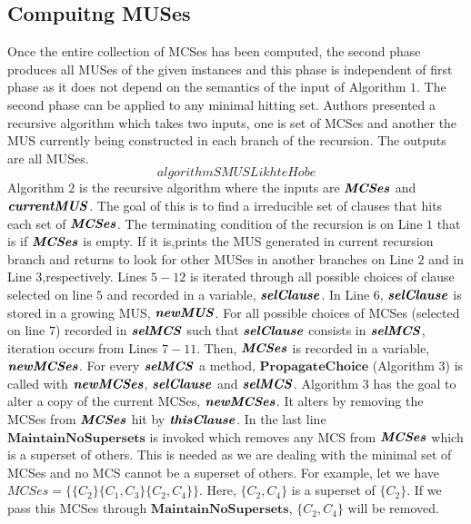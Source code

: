 \subsection{Compuitng MUSes}
Once the entire collection of MCSes has been computed, the second phase produces all MUSes of the given instances and this phase is independent of first phase as it does not depend on the semantics of the input of Algorithm $1$. The second phase can be applied to any minimal hitting set. Authors presented a recursive algorithm which takes two inputs, one is set of MCSes and another the MUS currently being constructed in each branch of the recursion. The outputs are all MUSes.\newline
$$algorithmSMUSLikhteHobe$$
Algorithm $2$ is the recursive algorithm where the inputs are $\textbf{\textit{MCSes}}$ and $\textbf{\textit{currentMUS}}$. The goal of this is to find a irreducible set of clauses that hits each set of $\textbf{\textit{MCSes}}$. The terminating condition of the recursion is on Line $1$ that is if $\textbf{\textit{MCSes}}$ is empty. If it is,prints the MUS generated in current recursion branch and returns to look for other MUSes in another branches on Line $2$ and in Line $3$,respectively. Lines $5-12$ is iterated through all possible choices of clause selected on line $5$ and recorded in a variable, $\textbf{\textit{selClause}}$. In Line $6$, $\textbf{\textit{selClause}}$ is stored in a growing MUS, $\textbf{\textit{newMUS}}$. For all possible choices of MCSes (selected on line $7$) recorded in $\textbf{\textit{selMCS}}$ such that $\textbf{\textit{selClause}}$ consists in $\textbf{\textit{selMCS}}$, iteration occurs from Lines $7-11$. Then, $\textbf{\textit{MCSes}}$ is recorded in a variable, $\textbf{\textit{newMCSes}}$.\newline
For every $\textbf{\textit{selMCS}}$ a method, $\textbf{PropagateChoice}$ (Algorithm $3$) is called with $\textbf{\textit{newMCSes}}$, $\textbf{\textit{selClause}}$ and $\textbf{\textit{selMCS}}$. Algorithm $3$ has the goal to alter a copy of the current MCSes, $\textbf{\textit{newMCSes}}$. It alters by removing the MCSes from $\textbf{\textit{MCSes}}$ hit by $\textbf{\textit{thisClause}}$. In the last line $\textbf{MaintainNoSupersets}$ is invoked which removes any MCS from $\textbf{\textit{MCSes}}$ which is a superset of others. This is needed as we are dealing with the minimal set of MCSes and no MCS cannot be a superset of others. For example, let we have $MCSes=\{\{C_{2}\}\{C_{1}, C_{3}\}\{C_{2},C_{4}\}\}$. Here, $\{C_{2},C_{4}\}$ is a superset of $\{C_{2}\}$. If we pass this MCSes through $\textbf{MaintainNoSupersets}$, $\{C_{2},C_{4}\}$ will be removed.\newline
